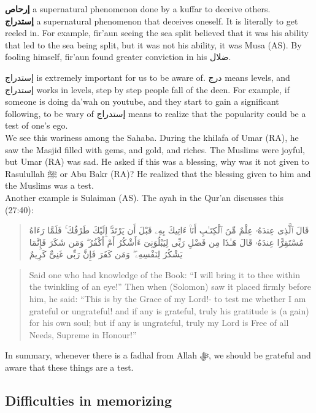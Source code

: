 \documentclass[
]{book}
\begin{document}
\textbf{إرحاص} a supernatural phenomenon done by a kuffar to deceive others.\\
\textbf{إستدراج} a supernatural phenomenon that deceives oneself. It is literally to get reeled in. For example, fir'aun seeing the sea split believed that it was his ability that led to the sea being split, but it was not his ability, it was Musa (AS). By fooling himself, fir'aun found greater conviction in his ضلال.

إستدراج is extremely important for us to be aware of. درج means levels, and إستدراج works in levels, step by step people fall of the deen. For example, if someone is doing da'wah on youtube, and they start to gain a significant following, to be wary of إستدراج means to realize that the popularity could be a test of one's ego.\\
We see this wariness among the Sahaba. During the khilafa of Umar (RA), he saw the Masjid filled with gems, and gold, and riches. The Muslims were joyful, but Umar (RA) was sad. He asked if this was a blessing, why was it not given to Rasulullah ﷺ or Abu Bakr (RA)? He realized that the blessing given to him and the Muslims was a test.\\
Another example is Sulaiman (AS). The ayah in the Qur'an discusses this (27:40):

\begin{quote}
قَالَ ٱلَّذِى عِندَهُۥ عِلْمٌ مِّنَ ٱلْكِتَـٰبِ أَنَا۠ ءَاتِيكَ بِهِۦ قَبْلَ أَن يَرْتَدَّ إِلَيْكَ طَرْفُكَ ۚ فَلَمَّا رَءَاهُ مُسْتَقِرًّا عِندَهُۥ قَالَ هَـٰذَا مِن فَضْلِ رَبِّى لِيَبْلُوَنِىٓ ءَأَشْكُرُ أَمْ أَكْفُرُ ۖ وَمَن شَكَرَ فَإِنَّمَا يَشْكُرُ لِنَفْسِهِۦ ۖ وَمَن كَفَرَ فَإِنَّ رَبِّى غَنِىٌّ كَرِيمٌ
\end{quote}

\begin{quote}
Said one who had knowledge of the Book: ``I will bring it to thee within the twinkling of an eye!'' Then when (Solomon) saw it placed firmly before him, he said: ``This is by the Grace of my Lord!- to test me whether I am grateful or ungrateful! and if any is grateful, truly his gratitude is (a gain) for his own soul; but if any is ungrateful, truly my Lord is Free of all Needs, Supreme in Honour!''
\end{quote}

In summary, whenever there is a fadhal from Allah ﷻ, we should be grateful and aware that these things are a test.

\hypertarget{difficulties-in-memorizing}{%
\subsection{Difficulties in memorizing}\label{difficulties-in-memorizing}}
\end{document}
